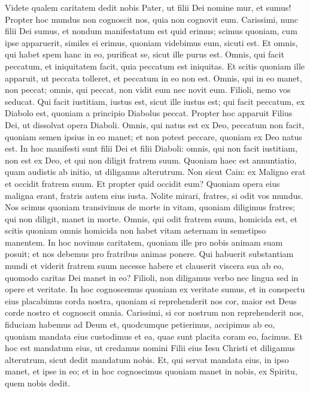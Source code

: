 \begin{biblechapter}
\begin{biblechapter}
\begin{biblechapter}
\verse Videte qualem caritatem dedit nobis Pater, ut filii Dei nomine mur, et sumus! Propter hoc mundus non cognoscit nos, quia non cognovit eum. 
\verse Carissimi, nunc filii Dei sumus, et nondum manifestatum est quid erimus; scimus quoniam, cum ipse apparuerit, similes ei erimus, quoniam videbimus eum, sicuti est.
 \verse Et omnis, qui habet spem hanc in eo, purificat se, sicut ille purus est. 
\verse Omnis, qui facit peccatum, et iniquitatem facit, quia peccatum est iniquitas. 
 \verse Et scitis quoniam ille apparuit, ut peccata tolleret, et peccatum in eo non est. 
\verse Omnis, qui in eo manet, non peccat; omnis, qui peccat, non vidit eum nec novit eum.
 \verse Filioli, nemo vos seducat. Qui facit iustitiam, iustus est, sicut ille iustus est; 
\verse qui facit peccatum, ex Diabolo est, quoniam a principio Diabolus peccat. Propter hoc apparuit Filius Dei, ut dissolvat opera Diaboli. 
\verse Omnis, qui natus est ex Deo, peccatum non facit, quoniam semen ipsius in eo manet; et non potest peccare, quoniam ex Deo natus est.
 \verse In hoc manifesti sunt filii Dei et filii Diaboli: omnis, qui non facit iustitiam, non est ex Deo, et qui non diligit fratrem suum.
 \verse Quoniam haec est annuntiatio, quam audistis ab initio, ut diligamus alterutrum. 
\verse Non sicut Cain: ex Maligno erat et occidit fratrem suum. Et propter quid occidit eum? Quoniam opera eius maligna erant, fratris autem eius iusta.
 \verse Nolite mirari, fratres, si odit vos mundus. 
\verse Nos scimus quoniam transivimus de morte in vitam, quoniam diligimus fratres; qui non diligit, manet in morte. 
\verse Omnis, qui odit fratrem suum, homicida est, et scitis quoniam omnis homicida non habet vitam aeternam in semetipso manentem.
 \verse In hoc novimus caritatem, quoniam ille pro nobis animam suam posuit; et nos debemus pro fratribus animas ponere. 
\verse Qui habuerit substantiam mundi et viderit fratrem suum necesse habere et clauserit viscera sua ab eo, quomodo caritas Dei manet in eo? 
\verse Filioli, non diligamus verbo nec lingua sed in opere et veritate. 
\verse In hoc cognoscemus quoniam ex veritate sumus, et in conspectu eius placabimus corda nostra, 
\verse quoniam si reprehenderit nos cor, maior est Deus corde nostro et cognoscit omnia. 
\verse Carissimi, si cor nostrum non reprehenderit nos, fiduciam habemus ad Deum 
\verse et, quodcumque petierimus, accipimus ab eo, quoniam mandata eius custodimus et ea, quae sunt placita coram eo, facimus.
 \verse Et hoc est mandatum eius, ut credamus nomini Filii eius Iesu Christi et diligamus alterutrum, sicut dedit mandatum nobis. 
\verse Et, qui servat mandata eius, in ipso manet, et ipse in eo; et in hoc cognoscimus quoniam manet in nobis, ex Spiritu, quem nobis dedit.
 

\end{biblechapter}
\end{biblechapter}
\end{biblechapter}
